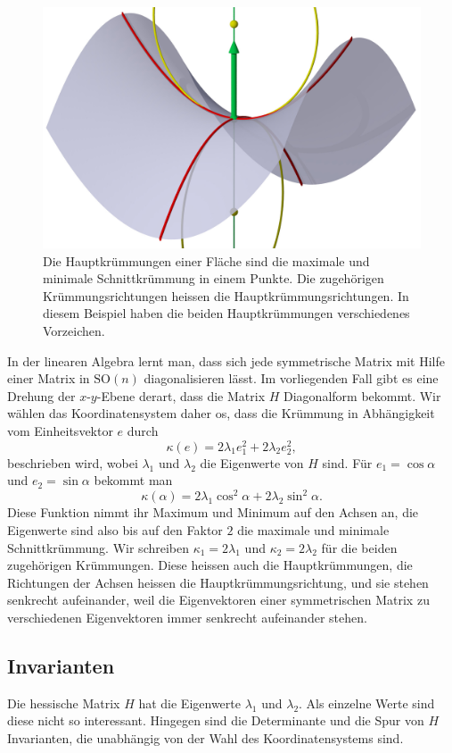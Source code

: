\begin{figure}
\centering
\includegraphics[width=\hsize]{chapters/3d/hauptkruemmungen.jpg}
\caption{Die Hauptkrümmungen einer Fläche sind die maximale und minimale
Schnittkrümmung in einem Punkte.
Die zugehörigen Krümmungsrichtungen heissen die Hauptkrümmungsrichtungen.
In diesem Beispiel haben die beiden Hauptkrümmungen verschiedenes Vorzeichen.
\label{skript:kurven:hauptkruemmungen}}
\end{figure}

In der linearen Algebra lernt man, dass sich jede symmetrische Matrix 
mit Hilfe einer Matrix in $\textrm{SO}(n)$ diagonalisieren lässt.
Im vorliegenden Fall gibt es eine Drehung der $x$-$y$-Ebene derart, dass
die Matrix $H$ Diagonalform bekommt.
Wir wählen das Koordinatensystem daher os, dass die
Krümmung in Abhängigkeit vom Einheitsvektor $e$ durch
\[
\kappa(e)
=
2\lambda_1 e_1^2 + 2\lambda_2 e_2^2,
\]
beschrieben wird,
wobei $\lambda_1$ und $\lambda_2$ die Eigenwerte von $H$ sind.
Für $e_1=\cos\alpha$ und $e_2=\sin\alpha$ bekommt man
\[
\kappa(\alpha)
=
2\lambda_1 \cos^2\alpha + 2\lambda_2 \sin^2\alpha.
\]
Diese Funktion nimmt ihr Maximum und Minimum auf den Achsen an,
die Eigenwerte sind also bis auf den Faktor $2$ die maximale und minimale
Schnittkrümmung.
Wir schreiben $\kappa_1=2\lambda_1$ und $\kappa_2=2\lambda_2$ für die
beiden zugehörigen Krümmungen.
Diese heissen auch die Hauptkrümmungen, die Richtungen der Achsen heissen
die Hauptkrümmungsrichtung, und sie stehen senkrecht aufeinander, weil
die Eigenvektoren einer symmetrischen Matrix zu verschiedenen Eigenvektoren
immer senkrecht aufeinander stehen.

\subsection{Invarianten}
Die hessische Matrix $H$ hat die Eigenwerte $\lambda_1$ und $\lambda_2$.
Als einzelne Werte sind diese nicht so interessant.
Hingegen sind die Determinante und die Spur von $H$ Invarianten, die
unabhängig von der Wahl des Koordinatensystems sind.

